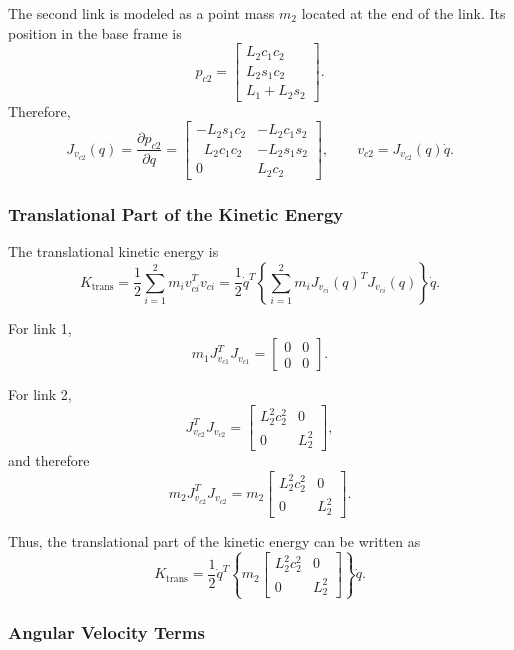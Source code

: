 \documentclass{article}
\begin{document}
The second link is modeled as a point mass \(m_2\) located at the end of the link. Its position in the base frame is
\[
p_{c2} =
\begin{bmatrix}
L_2 c_1 c_2\\
L_2 s_1 c_2\\
L_1 + L_2 s_2
\end{bmatrix}.
\]
Therefore,
\[
J_{v_{c2}}(q)
=
\frac{\partial p_{c2}}{\partial q}
=
\begin{bmatrix}
- L_2 s_1 c_2 & -L_2 c_1 s_2\\
\;\;L_2 c_1 c_2 & -L_2 s_1 s_2\\
0 & L_2 c_2
\end{bmatrix},
\qquad
v_{c2}=J_{v_{c2}}(q)\dot q.
\]

\subsubsection*{Translational Part of the Kinetic Energy}

The translational kinetic energy is
\[
K_{\mathrm{trans}}
=
\frac{1}{2}\sum_{i=1}^{2} m_i v_{ci}^T v_{ci}
=
\frac{1}{2}\dot q^T
\left\{
\sum_{i=1}^{2} m_i J_{v_{ci}}(q)^T J_{v_{ci}}(q)
\right\}\dot q.
\]

For link 1,
\[
m_1 J_{v_{c1}}^T J_{v_{c1}}
=
\begin{bmatrix}
0 & 0\\
0 & 0
\end{bmatrix}.
\]

For link 2,
\[
J_{v_{c2}}^T J_{v_{c2}}
=
\begin{bmatrix}
L_2^2 c_2^2 & 0\\
0 & L_2^2
\end{bmatrix},
\]
and therefore
\[
m_2 J_{v_{c2}}^T J_{v_{c2}}
=
m_2
\begin{bmatrix}
L_2^2 c_2^2 & 0\\
0 & L_2^2
\end{bmatrix}.
\]

Thus, the translational part of the kinetic energy can be written as
\[
K_{\mathrm{trans}}
=
\frac{1}{2}\dot q^T
\left\{
m_2
\begin{bmatrix}
L_2^2 c_2^2 & 0\\
0 & L_2^2
\end{bmatrix}
\right\}\dot q.
\]

\subsubsection*{Angular Velocity Terms}
\end{document}
